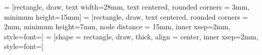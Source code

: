 
 = [rectangle, draw, text width=28mm, text centered, rounded corners = 3mm, minimum height=15mm]
 = [rectangle, draw, text centered, rounded corners = 2mm,
        minimum height=7mm, node distance = 15mm, inner xsep=2mm, style={font=\footnotesize}]
 = [shape = rectangle, draw, thick, align = center, inner xsep=2mm, style={font=\footnotesize}]
